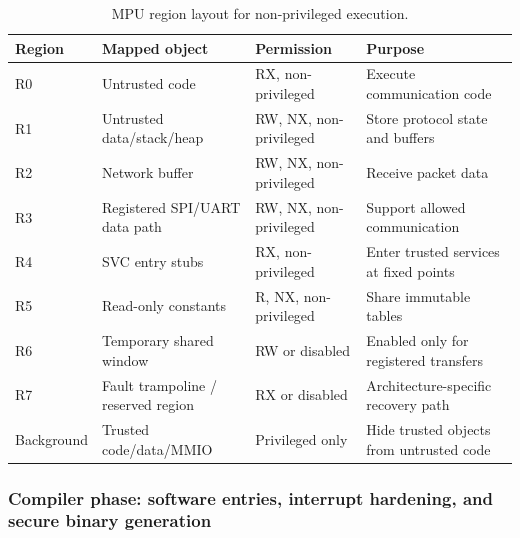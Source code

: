\documentclass[sigconf]{acmart}
\begin{document}
\begin{table}[t]
\centering
\caption{MPU region layout for non-privileged execution.}
\label{tab:mpu_regions}
\footnotesize
\begin{tabular}{llll}
\toprule
\textbf{Region} & \textbf{Mapped object} & \textbf{Permission} & \textbf{Purpose} \\
\midrule
R0 & Untrusted code & RX, non-privileged & Execute communication code \\
R1 & Untrusted data/stack/heap & RW, NX, non-privileged & Store protocol state and buffers \\
R2 & Network buffer & RW, NX, non-privileged & Receive packet data \\
R3 & Registered SPI/UART data path & RW, NX, non-privileged & Support allowed communication \\
R4 & SVC entry stubs & RX, non-privileged & Enter trusted services at fixed points \\
R5 & Read-only constants & R, NX, non-privileged & Share immutable tables \\
R6 & Temporary shared window & RW or disabled & Enabled only for registered transfers \\
R7 & Fault trampoline / reserved region & RX or disabled & Architecture-specific recovery path \\
Background & Trusted code/data/MMIO & Privileged only & Hide trusted objects from untrusted code \\
\bottomrule
\end{tabular}
\end{table}


\subsubsection{Compiler phase: software entries, interrupt hardening, and secure binary generation}
\end{document}
